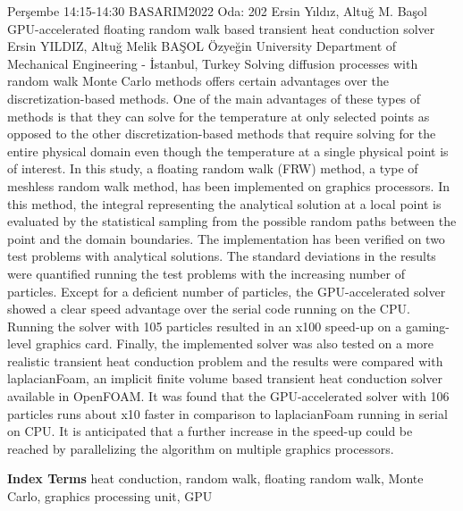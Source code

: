 
    \begin{abstract_basarim}
    {Perşembe 14:15-14:30}
    {BASARIM2022}
    {Oda: 202}
    {Ersin Yıldız, Altuğ M. Başol}
    {GPU-accelerated floating random walk based transient heat conduction solver}
    {%
    Ersin YILDIZ, Altuğ Melik BAŞOL}
    {%
    }
    {%
    Özyeğin University Department of Mechanical Engineering - İstanbul, Turkey}
    Solving diffusion processes with random walk Monte Carlo methods offers certain advantages over the discretization-based methods. One of the main advantages of these types of methods is that they can solve for the temperature at only selected points as opposed to the other discretization-based methods that require solving for the entire physical domain even though the temperature at a single physical point is of interest. In this study, a floating random walk (FRW) method, a type of meshless random walk method, has been implemented on graphics processors. In this method, the integral representing the analytical solution at a local point is evaluated by the statistical sampling from the possible random paths between the point and the domain boundaries. The implementation has been verified on two test problems with analytical solutions. The standard deviations in the results were quantified running the test problems with the increasing number of particles. Except for a deficient number of particles, the GPU-accelerated solver showed a clear speed advantage over the serial code running on the CPU. Running the solver with 105 particles resulted in an x100 speed-up on a gaming-level graphics card. Finally, the implemented solver was also tested on a more realistic transient heat conduction problem and the results were compared with laplacianFoam, an implicit finite volume based transient heat conduction solver available in OpenFOAM. It was found that the GPU-accelerated solver with 106 particles runs about x10 faster in comparison to laplacianFoam running in serial on CPU. It is anticipated that a further increase in the speed-up could be reached by parallelizing the algorithm on multiple graphics processors. 
    
            \textbf{Index Terms} \newline{}heat conduction, random walk, floating random walk, Monte Carlo, graphics processing unit, GPU
    \end{abstract_basarim}
    